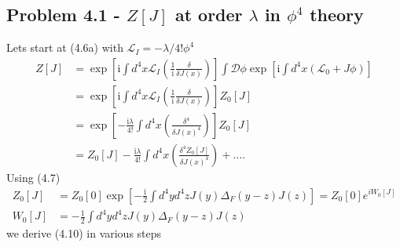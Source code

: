 \documentclass[../main.tex]{subfiles}
\begin{document}
\subsection{Problem 4.1 - \texorpdfstring{$Z[J]$}{Lg} at order \texorpdfstring{$\lambda$}{Lg} in \texorpdfstring{$\phi^4$}{Lg} theory}
Lets start at (4.6a) with $\mathscr{L}_I=-\lambda/4!\phi^4$
\begin{align}
    Z[J]&=\exp\left[\text{i}\int d^4x\mathscr{L}_I\left(\frac{1}{\text{i}}\frac{\delta}{\delta J(x)}\right)\right]\int\mathcal{D}\phi\exp\left[\text{i}\int d^4x(\mathscr{L}_0+J\phi)\right]\\
    &=\exp\left[\text{i}\int d^4x\mathscr{L}_I\left(\frac{1}{\text{i}}\frac{\delta}{\delta J(x)}\right)\right]Z_0[J]\\
    &=\exp\left[-\frac{\text{i}\lambda}{4!}\int d^4x\left(\frac{\delta^4 }{\delta J(x)^4}\right)\right]Z_0[J]\\
    &=Z_0[J]-\frac{\text{i}\lambda}{4!}\int d^4x\left(\frac{\delta^4 Z_0[J]}{\delta J(x)^4}\right)+\dots.
\end{align}
Using (4.7)
\begin{align}
    Z_0[J]&=Z_0[0]\exp\left[-\frac{\text{i}}{2}\int d^4yd^4zJ(y)\Delta_F(y-z)J(z)\right]=Z_0[0]e^{iW_0[J]}\\
    W_0[J]&=-\frac{1}{2}\int d^4yd^4zJ(y)\Delta_F(y-z)J(z)
\end{align}
we derive (4.10) in various steps 
\end{document}
